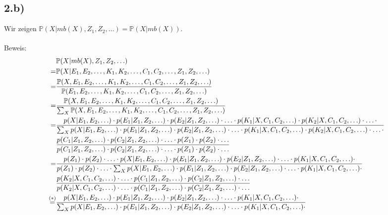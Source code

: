 \documentclass[a4paper]{article}
\newcommand{\IP}{\mathbb{P}}
\begin{document}
\subsection*{2.b)}
Wir zeigen $\IP(X|mb(X),Z_1,Z_2,\ldots) = \IP(X|mb(X))$.\\
\\
Beweis:
\begin{align} 
	 & \IP(X|mb(X),Z_1,Z_2,\ldots) \notag \\
	=& \IP(X|E_1,E_2,\ldots,K_1,K_2,\ldots,C_1,C_2,\ldots,Z_1,Z_2,\ldots) \notag \\
	=& \frac{\IP(X,E_1,E_2,\ldots,K_1,K_2,\ldots,C_1,C_2,\ldots,Z_1,Z_2,\ldots)}{\IP(E_1,E_2,\ldots,K_1,K_2,\ldots,C_1,C_2,\ldots,Z_1,Z_2,\ldots)} \notag \\
	=& \frac{\IP(X,E_1,E_2,\ldots,K_1,K_2,\ldots,C_1,C_2,\ldots,Z_1,Z_2,\ldots)}{\sum_{X} \IP(X,E_1,E_2,\ldots,K_1,K_2,\ldots,C_1,C_2,\ldots,Z_1,Z_2,\ldots)} \notag \\
	=& \frac{p(X|E_1,E_2,\ldots) \cdot p(E_1|Z_1,Z_2,\ldots) \cdot p(E_2|Z_1,Z_2,\ldots) \cdot \ldots \cdot p(K_1|X,C_1,C_2,\ldots) \cdot p(K_2|X,C_1,C_2,\ldots) \cdot \ldots \cdot }{\sum_{X} p(X|E_1,E_2,\ldots) \cdot p(E_1|Z_1,Z_2,\ldots) \cdot p(E_2|Z_1,Z_2,\ldots) \cdot \ldots \cdot p(K_1|X,C_1,C_2,\ldots) \cdot p(K_2|X,C_1,C_2,\ldots) \cdot \ldots \cdot} \notag \\
	& \frac{p(C_1|Z_1,Z_2,\ldots) \cdot p(C_2|Z_1,Z_2,\ldots) \cdot \ldots \cdot p(Z_1) \cdot p(Z_2) \cdot \ldots}{p(C_1|Z_1,Z_2,\ldots) \cdot p(C_2|Z_1,Z_2,\ldots) \cdot \ldots \cdot p(Z_1) \cdot p(Z_2) \cdot \ldots} \notag \\
		=& \frac{p(Z_1) \cdot p(Z_2) \cdot \ldots \cdot p(X|E_1,E_2,\ldots) \cdot p(E_1|Z_1,Z_2,\ldots) \cdot p(E_2|Z_1,Z_2,\ldots) \cdot \ldots \cdot p(K_1|X,C_1,C_2,\ldots) \cdot}{p(Z_1) \cdot p(Z_2) \cdot \ldots \cdot \sum_{X} p(X|E_1,E_2,\ldots) \cdot p(E_1|Z_1,Z_2,\ldots) \cdot p(E_2|Z_1,Z_2,\ldots) \cdot \ldots \cdot p(K_1|X,C_1,C_2,\ldots) \cdot} \notag \\
	& \frac{p(K_2|X,C_1,C_2,\ldots) \cdot \ldots \cdot p(C_1|Z_1,Z_2,\ldots) \cdot p(C_2|Z_1,Z_2,\ldots) \cdot \ldots}{p(K_2|X,C_1,C_2,\ldots) \cdot \ldots \cdot p(C_1|Z_1,Z_2,\ldots) \cdot p(C_2|Z_1,Z_2,\ldots) \cdot \ldots} \notag \\
	\stackrel{(\ast)}{=}& \frac{p(X|E_1,E_2,\ldots) \cdot p(E_1|Z_1,Z_2,\ldots) \cdot p(E_2|Z_1,Z_2,\ldots) \cdot \ldots \cdot p(K_1|X,C_1,C_2,\ldots) \cdot}{\sum_{X} p(X|E_1,E_2,\ldots) \cdot p(E_1|Z_1,Z_2,\ldots) \cdot p(E_2|Z_1,Z_2,\ldots) \cdot \ldots \cdot p(K_1|X,C_1,C_2,\ldots) \cdot} \notag \\

\end{align}
\end{document}
